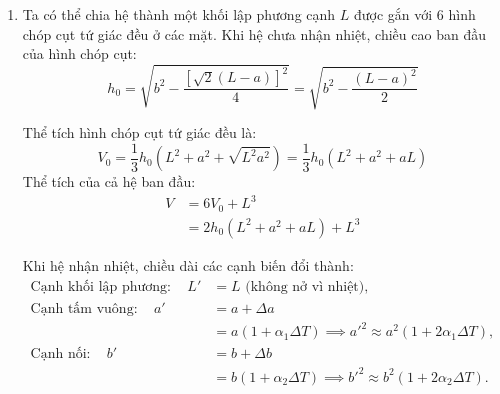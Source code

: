 \begin{enumerate}[label=(\alph*)]
Do độ dày vuông góc với mặt giấy của các thanh là như nhau và không đổi, tỉ số thể tích bằng tỉ số diện tích:
\begin{equation}
\begin{aligned}
  \frac{V'}{V} = \frac{S'}{S} &\approx 1 + \left( \frac{16L_2^2\alpha_2-4L_3(L_3-L_1)\alpha_3}{16L_2^2-(L_3-L_1)^2} + \frac{L_3\alpha_3}{L_1+L_3} \right)\Delta T \\
  &= 1 + \left[ \frac{16L_2^2(L_1+L_3)\alpha_2 + L_3(16L_2^2 - 5L_3^2 + 2L_1L_3 + 3L_1^2)\alpha_3}{(L_1+L_3)\left[16L_2^2-(L_3-L_1)^2\right]} \right]\Delta T
\end{aligned}
\end{equation}

\item
Ta có thể chia hệ thành một khối lập phương cạnh $L$ được gắn với 6 hình chóp cụt tứ giác đều ở các mặt. Khi hệ chưa nhận nhiệt, chiều cao ban đầu của hình chóp cụt: 
\begin{equation}
 h_0=\sqrt{b^2 - \frac{[\sqrt{2}(L-a)]^2}{4}}=\sqrt{b^2 - \frac{(L-a)^2}{2}}
\end{equation}

Thể tích hình chóp cụt tứ giác đều là:
\begin{equation}
  V_0=\frac{1}{3}h_0 \left( L^2 +a^2 + \sqrt{L^2 a^2} \right)= \frac{1}{3}h_0 \left( L^2 +a^2 + aL \right)
\end{equation}
Thể tích của cả hệ ban đầu:
\begin{equation}
\begin{aligned}
  V&=6V_0+L^3\\
  &=2h_0(L^2 +a^2 + aL) + L^3
\end{aligned}
\end{equation}

Khi hệ nhận nhiệt, chiều dài các cạnh biến đổi thành:
\begin{equation}
\begin{aligned}
  \text{Cạnh khối lập phương}:\quad L'&=L \text{ (không nở vì nhiệt)},\\
  \text{Cạnh tấm vuông}:\quad a'&=a+\Delta a \\ 
  &=a(1+\alpha_1\Delta T) \implies a'^2 \approx a^2(1+ 2\alpha_1 \Delta T),\\
  \text{Cạnh nối}:\quad b'&=b+\Delta b \\
  &=b(1+\alpha_2\Delta T) \implies b'^2 \approx b^2(1+ 2\alpha_2 \Delta T).
\end{aligned}
\end{equation}


\end{enumerate}
